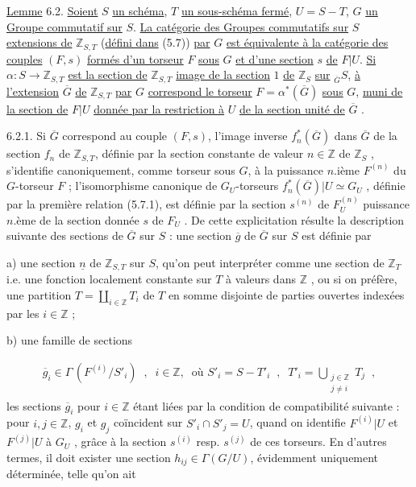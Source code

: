 \underline{Lemme} 6.2. \underline{Soient} $S$ \underline{un schéma}, $T$ \underline{un sous-schéma fermé}, $U = S-T$, $G$ \underline{un Groupe commutatif sur} $S$. \underline{La catégorie des Groupes commutatifs sur} $S$ \underline{extensions de} $\mathbb{Z}_{S,T}$ (\underline{défini dans} (5.7)) \underline{par} $G$ \underline{est équivalente à la catégorie des couples} $(F,s)$ \underline{formés d'un torseur} $F$ \underline{sous} $G$ \underline{et d'une section} $s$ \underline{de} $F|U$. \underline{Si} $\alpha : S \longrightarrow \mathbb{Z}_{S,T}$ \underline{est la section de} $\mathbb{Z}_{S,T}$ \underline{image de la section} $1$ \underline{de} $\mathbb{Z}_S$ \underline{sur} ${}_{\overline{G}}S$, \underline{à l'extension} $\overline{G}$ \underline{de} $\mathbb{Z}_{S,T}$ \underline{par} $G$ \underline{correspond le torseur} $F = \alpha^*(\overline{G})$ \underline{sous} $G$, \underline{muni de la section de} $F|U$ \underline{donnée par la restriction à} $U$ \underline{de la section unité de} $\overline{G}$ .



6.2.1. Si $\overline{G}$ correspond au couple $(F,s)$, l'image inverse $f^*_n(\overline{G})$ dans $\overline{G}$ de la section $f_n$ de $\mathbb{Z}_{S,T}$, définie par la section constante de valeur $n \in \mathbb{Z}$ de $\mathbb{Z}_S$ , s'identifie canoniquement, comme torseur sous $G$, à la puissance $n$.ième $F^{(n)}$ du $G$-torseur $F$ ; l'isomorphisme canonique de $G_U$-torseurs $f^*_n(\overline{G})|U \simeq G_U$ , définie par la première relation (5.7.1), est définie par la section $s^{(n)}$ de $F^{(n)}_U$ puissance $n$.ème de la section donnée $s$ de $F_U$ . De cette explicitation résulte la description suivante des sections de $\overline{G}$ sur $S$ : une section $\overline{g}$ de $\overline{G}$ sur $S$ est définie par

a) une section $\underline{n}$ de $\mathbb{Z}_{S,T}$ sur $S$, qu'on peut interpréter comme une section de $\mathbb{Z}_T$ i.e. une fonction localement constante sur $T$ à valeurs dans $\mathbb{Z}$ , ou si on préfère, une partition $T = \coprod\limits_{i \in \mathbb{Z}} T_i$ de $T$ en somme disjointe de parties ouvertes indexées par les $i \in \mathbb{Z}$ ;

b) une famille de sections

\begin{multline*}
\overline{g}_i \in \Gamma\,(F^{(i)}/S'_i) \;\;,\;\; i \in \mathbb{Z},\;\; \text{où } S'_i = S - T'_i \;\;,\;\; T'_i = \bigcup_{\substack{j \in \mathbb{Z} \\ j \neq i}} T_j \;\;,
\end{multline*}
les sections $\overline{g}_i$ pour $i \in \mathbb{Z}$ étant liées par la condition de compatibilité suivante : pour $i,j \in \mathbb{Z}$, $g_i$ et $g_j$ coïncident sur $S'_i \cap S'_j = U$, quand on identifie $F^{(i)}|U$ et $F^{(j)}|U$ à $G_U$ , grâce à la section $s^{(i)}$ resp. $s^{(j)}$ de ces torseurs. En d'autres termes, il doit exister une section $h_{ij} \in \Gamma(G/U)$, évidemment uniquement déterminée, telle qu'on ait

